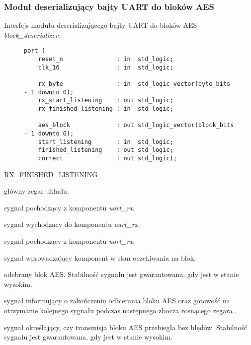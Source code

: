 \subsubsection{Moduł deserializujący bajty UART do bloków AES}
Interfejs modułu deserializującego bajty UART do bloków AES \textit{block\_deserializer}:

\begin{figure}[!h]
\begin{lstlisting}[style=vhdl]
port (
	reset_n               : in  std_logic;
	clk_16                : in  std_logic;

	rx_byte               : in  std_logic_vector(byte_bits - 1 downto 0);
	rx_start_listening    : out std_logic;
	rx_finished_listening : in  std_logic;

	aes_block             : out std_logic_vector(block_bits - 1 downto 0);
	start_listening       : in  std_logic;
	finished_listening    : out std_logic;
	correct               : out std_logic);
\end{lstlisting}
\end{figure}

\begin{interface}{RX\_FINISHED\_LISTENING}
	\item[\insignal{CLK\_16}] główny zegar układu.

	\item[\insignal{RX\_BYTE[7:0]}] sygnał pochodzący z komponentu \textit{uart\_rx}.
	\item[\outsignal{RX\_START\_LISTENING}] sygnał wychodzący do komponentu \textit{uart\_rx}.
	\item[\insignal{RX\_FINISHED\_LISTENING}] sygnał pochodzący z komponentu \textit{uart\_rx}.

	\item[\insignal{START\_LISTENING}] sygnał wprowadzający komponent w stan oczekiwania na blok.
	\item[\outsignal{AES\_BLOCK[127:0]}] odebrany blok AES. Stabilność sygnału jest gwarantowana, gdy  jest w stanie wysokim.
	\item[\outsignal{FINISHED\_LISTENING}] sygnał informujący o zakończeniu odbierania bloku AES oraz gotowość na otrzymanie kolejnego sygnału  podczas następnego zbocza rosnącego zegara .
	\item[\outsignal{CORRECT}] sygnał określający, czy transmisja bloku AES przebiegła bez błędów. Stabilność sygnału jest gwarantowana, gdy  jest w stanie wysokim.
\end{interface}

